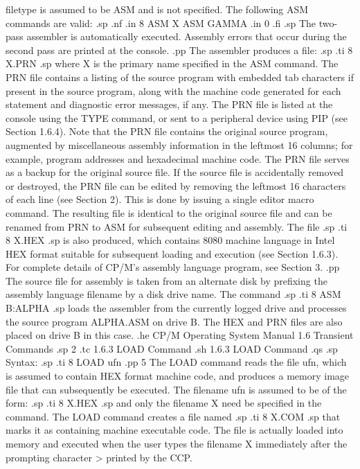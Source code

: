 filetype is assumed to be ASM and is not specified.  The following ASM 
commands are valid:
.sp
.nf
.in 8
ASM X
ASM GAMMA
.in 0
.fi
.sp
The two-pass assembler is automatically executed.  Assembly errors that occur 
during the second pass are printed at the console.
.pp
The assembler produces a file:
.sp
.ti 8
X.PRN
.sp
where X is the primary name specified in the ASM command.  The PRN file 
contains a listing of the source program with embedded tab characters if 
present in the source program, along with the machine code generated for 
each statement and diagnostic error messages, if any.  The PRN file is listed 
at the console using the TYPE command, or sent to a peripheral device 
using PIP (see Section 1.6.4).  Note that the PRN file 
contains the original source program, augmented by miscellaneous assembly 
information in the leftmost 16 columns; for example, program addresses and 
hexadecimal 
machine code.  The PRN file serves as a backup for the original 
source file.  If the source file is accidentally removed or destroyed, the 
PRN file can be edited by removing the leftmost 16 characters 
of each line (see Section 2).  This is done by issuing a single editor macro 
command.  
The resulting file is identical to the original source file and can be 
renamed from PRN to ASM for subsequent editing and assembly.  The file
.sp
.ti 8
X.HEX
.sp
is also produced, which contains 8080 machine language in Intel HEX format 
suitable for subsequent loading and execution (see Section 1.6.3).  For 
complete details of CP/M's assembly language program, see Section 3.
.pp
The source file for assembly is taken from an alternate disk by prefixing the 
assembly language filename by a disk drive name.  The command
.sp
.ti 8
ASM B:ALPHA
.sp
loads the assembler from the currently logged drive and processes the source 
program ALPHA.ASM on drive B.  The HEX and PRN files are also placed on 
drive B in this case.
.he CP/M Operating System Manual              1.6  Transient Commands
.sp 2
.tc         1.6.3  LOAD Command
.sh
1.6.3  LOAD Command
.qs
.sp
Syntax:
.sp
.ti 8
LOAD ufn
.pp 5
The LOAD command reads the file ufn, which is assumed to contain HEX format 
machine code, and produces a memory image file that can subsequently be 
executed.  The filename ufn is assumed to be of the form:
.sp
.ti 8
X.HEX
.sp
and only the filename X need be specified in the command.  The LOAD command 
creates a file named
.sp
.ti 8
X.COM
.sp
that marks it as containing machine executable code.  The file is actually 
loaded into memory and executed when the user types the filename X 
immediately after the prompting character > printed by the CCP.

